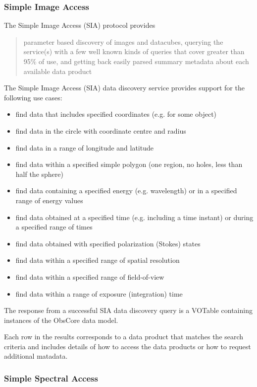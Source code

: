 \documentclass{article}
\begin{document}
{\subsubsection{Simple Image Access}

The Simple Image Access (SIA) protocol provides 
\begin{quote}
parameter based discovery of images and datacubes, querying the service(s) with
a few well known kinds of queries that cover greater than 95\% of use, and
getting back easily parsed summary metadata about each available data product
\end{quote}

The Simple Image Access (SIA) data discovery service provides support for
the following use cases:

\begin{itemize}
  \item find data that includes specified coordinates (e.g. for some object) 
  \item find data in the circle with coordinate centre and radius 
  \item find data in a range of longitude and latitude 
  \item find data within a specified simple  polygon (one region, no holes, less
  than half the sphere)
  \item find data containing a specified energy (e.g. wavelength) or in a
  specified range of energy values
  \item find data obtained at a specified time (e.g. including a time instant)
  or during a specified range of times
  \item find data obtained with specified polarization (Stokes) states 
  \item find data within a specified range of spatial resolution 
  \item find data within a specified range of field-of-view 
  \item find data within a range of exposure (integration) time 
\end{itemize}

The response from a successful SIA data discovery query is a VOTable containing
instances of the ObsCore  data
model.

Each row in the results corresponds to a data product that matches the search
criteria and includes details of how to access the data products or how
to request additional matadata.

\subsubsection{Simple Spectral Access}

}
\end{document}
